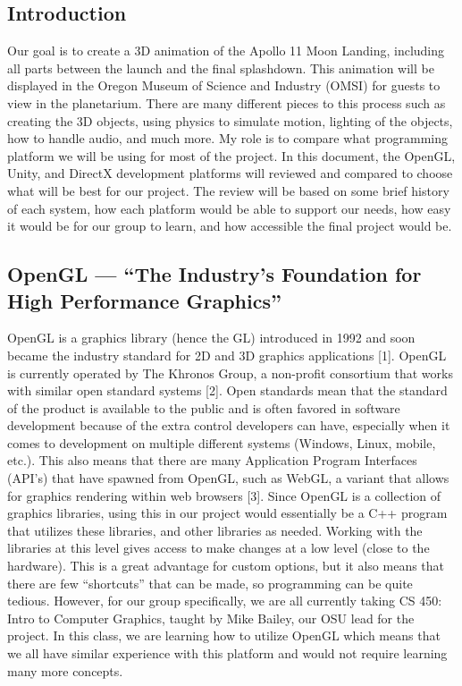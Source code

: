 \documentclass[onecolumn, draftclsnofoot,10pt, compsoc]{IEEEtran}
\begin{document}
\newpage
{}

\subsection{Introduction}
Our goal is to create a 3D animation of the Apollo 11 Moon Landing, including all parts between the launch and the final splashdown. This animation will be displayed in the Oregon Museum of Science and Industry (OMSI) for guests to view in the planetarium. There are many different pieces to this process such as creating the 3D objects, using physics to simulate motion, lighting of the objects, how to handle audio, and much more. My role is to compare what programming platform we will be using for most of the project. In this document, the OpenGL, Unity, and DirectX development platforms will reviewed and compared to choose what will be best for our project. The review will be based on some brief history of each system, how each platform would be able to support our needs, how easy it would be for our group to learn, and how accessible the final project would be.

\subsection{OpenGL --- ``The Industry's Foundation for High Performance Graphics''}
OpenGL is a graphics library (hence the GL) introduced in 1992 and soon became the industry standard for 2D and 3D graphics applications [1]. OpenGL is currently operated by The Khronos Group, a non-profit consortium that works with similar open standard systems [2].  Open standards mean that the standard of the product is available to the public and is often favored in software development because of the extra control developers can have, especially when it comes to development on multiple different systems (Windows, Linux, mobile, etc.). This also means that there are many Application Program Interfaces (API's) that have spawned from OpenGL, such as WebGL, a variant that allows for graphics rendering within web browsers [3].
\newline
\newline
Since OpenGL is a collection of graphics libraries, using this in our project would essentially be a C++ program that utilizes these libraries, and other libraries as needed. Working with the libraries at this level gives access to make changes at a low level (close to the hardware). This is a great advantage for custom options, but it also means that there are few “shortcuts” that can be made, so programming can be quite tedious. However, for our group specifically, we are all currently taking CS 450: Intro to Computer Graphics, taught by Mike Bailey, our OSU lead for the project. In this class, we are learning how to utilize OpenGL which means that we all have similar experience with this platform and would not require learning many more concepts. 
\end{document}
